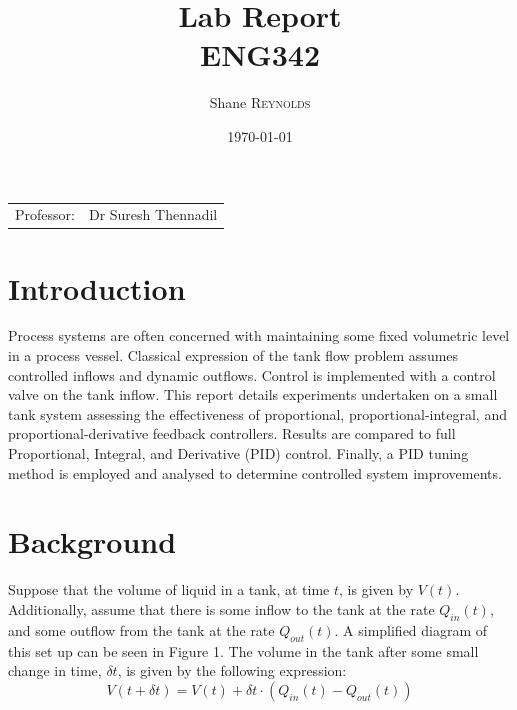 \documentclass{article}
\title{Lab Report \\ ENG342} %
\author{Shane \textsc{Reynolds}} %
\date{\today} %
\begin{document}
\maketitle %

\begin{center}
\begin{tabular}{l r}
Professor: & Dr Suresh Thennadil %
\end{tabular}
\end{center}

\tableofcontents
\newpage


\section{Introduction}
Process systems are often concerned with maintaining some fixed volumetric level in a process vessel. Classical expression of the tank flow problem assumes controlled inflows and dynamic outflows. Control is implemented with a control valve on the tank inflow. This report details experiments undertaken on a small tank system assessing the effectiveness of proportional, proportional-integral, and proportional-derivative feedback controllers. Results are compared to full Proportional, Integral, and Derivative (PID) control. Finally, a PID tuning method is employed and analysed to determine controlled system improvements.


\section{Background}
Suppose that the volume of liquid in a tank, at time $t$, is given by $V(t)$. Additionally, assume that there is some inflow to the tank at the rate $Q_{in}(t)$, and some outflow from the tank at the rate $Q_{out}(t)$. A simplified diagram of this set up can be seen in Figure 1. The volume in the tank after some small change in time, $\delta t$, is given by the following expression:
\begin{equation}
	V(t + \delta t) = V(t) + \delta t \cdot (Q_{in}(t) - Q_{out}(t))
\end{equation}
\end{document}
